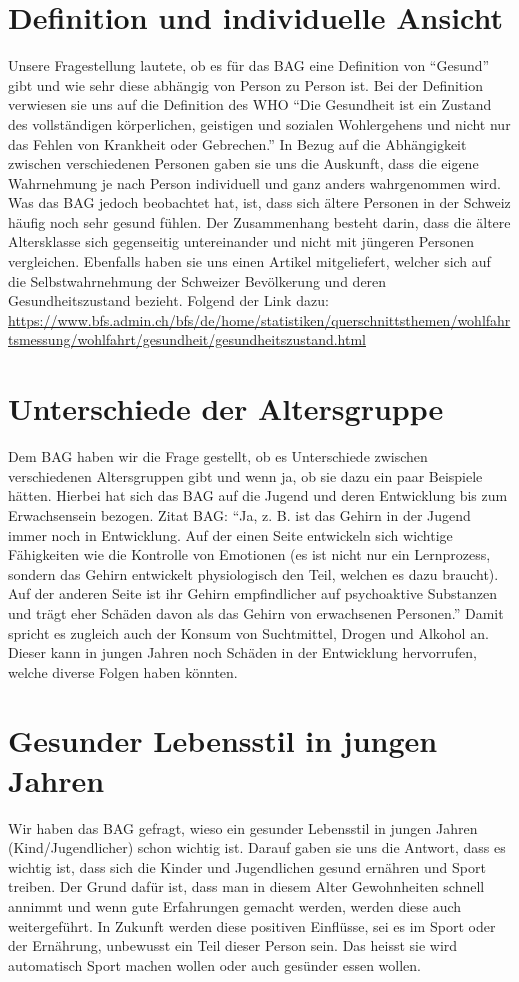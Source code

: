 \section{Definition und individuelle Ansicht}
Unsere Fragestellung lautete, ob es für das BAG eine Definition von “Gesund” gibt und wie sehr diese abhängig von Person zu Person ist. Bei der Definition verwiesen sie uns auf die Definition des WHO “Die Gesundheit ist ein Zustand des vollständigen körperlichen, geistigen und sozialen Wohlergehens und nicht nur das Fehlen von Krankheit oder Gebrechen.” \cite{gesundheit_definition}
In Bezug auf die Abhängigkeit zwischen verschiedenen Personen gaben sie uns die Auskunft, dass die eigene Wahrnehmung je nach Person individuell und ganz anders wahrgenommen wird. Was das BAG jedoch beobachtet hat, ist, dass sich ältere Personen in der Schweiz häufig noch sehr gesund fühlen. Der Zusammenhang besteht darin, dass die ältere Altersklasse sich gegenseitig untereinander und nicht mit jüngeren Personen vergleichen. Ebenfalls haben sie uns einen Artikel mitgeliefert, welcher sich auf die Selbstwahrnehmung der Schweizer Bevölkerung und deren Gesundheitszustand bezieht. Folgend der Link dazu:
\newline
\url{https://www.bfs.admin.ch/bfs/de/home/statistiken/querschnittsthemen/wohlfahrtsmessung/wohlfahrt/gesundheit/gesundheitszustand.html}
\section{Unterschiede der Altersgruppe}
Dem BAG haben wir die Frage gestellt, ob es Unterschiede zwischen verschiedenen Altersgruppen gibt und wenn ja, ob sie dazu ein paar Beispiele hätten. Hierbei hat sich das BAG auf die Jugend und deren Entwicklung bis zum Erwachsensein bezogen. Zitat BAG: “Ja, z. B. ist das Gehirn in der Jugend immer noch in Entwicklung. Auf der einen Seite entwickeln sich wichtige Fähigkeiten wie die Kontrolle von Emotionen (es ist nicht nur ein Lernprozess, sondern das Gehirn entwickelt physiologisch den Teil, welchen es dazu braucht). Auf der anderen Seite ist ihr Gehirn empfindlicher auf psychoaktive Substanzen und trägt eher Schäden davon als das Gehirn von erwachsenen Personen.” Damit spricht es zugleich auch der Konsum von Suchtmittel, Drogen und Alkohol an. Dieser kann in jungen Jahren noch Schäden in der Entwicklung hervorrufen, welche diverse Folgen haben könnten.
\section{Gesunder Lebensstil in jungen Jahren}
Wir haben das BAG gefragt, wieso ein gesunder Lebensstil in jungen Jahren (Kind/Jugendlicher) schon wichtig ist. Darauf gaben sie uns die Antwort, dass es wichtig ist, dass sich die Kinder und Jugendlichen gesund ernähren und Sport treiben. Der Grund dafür ist, dass man in diesem Alter Gewohnheiten schnell annimmt und wenn gute Erfahrungen gemacht werden, werden diese auch weitergeführt. In Zukunft werden diese positiven Einflüsse, sei es im Sport oder der Ernährung, unbewusst ein Teil dieser Person sein. Das heisst sie wird automatisch Sport machen wollen oder auch gesünder essen wollen.
